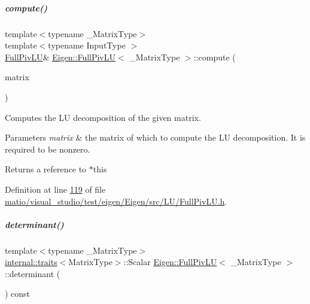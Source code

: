 \mbox{\label{group___l_u___module_a0a3c3b1bbafa31a03567a4573ebabc79}} 
\subparagraph{\texorpdfstring{compute()}{compute()}\hspace{0.1cm}{\footnotesize\ttfamily [2/2]}}
{\footnotesize\ttfamily template$<$typename \+\_\+\+Matrix\+Type$>$ \\
template$<$typename Input\+Type $>$ \\
\hyperlink{group___l_u___module_class_eigen_1_1_full_piv_l_u}{Full\+Piv\+LU}\& \hyperlink{group___l_u___module_class_eigen_1_1_full_piv_l_u}{Eigen\+::\+Full\+Piv\+LU}$<$ \+\_\+\+Matrix\+Type $>$\+::compute (\begin{DoxyParamCaption}\item[{const \hyperlink{group___core___module_struct_eigen_1_1_eigen_base}{Eigen\+Base}$<$ Input\+Type $>$ \&}]{matrix }\end{DoxyParamCaption})\hspace{0.3cm}{\ttfamily [inline]}}

Computes the LU decomposition of the given matrix.


\begin{DoxyParams}{Parameters}
{\em matrix} & the matrix of which to compute the LU decomposition. It is required to be nonzero.\\
\hline
\end{DoxyParams}
\begin{DoxyReturn}{Returns}
a reference to $\ast$this 
\end{DoxyReturn}


Definition at line \hyperlink{matio_2visual__studio_2test_2eigen_2_eigen_2src_2_l_u_2_full_piv_l_u_8h_source_l00119}{119} of file \hyperlink{matio_2visual__studio_2test_2eigen_2_eigen_2src_2_l_u_2_full_piv_l_u_8h_source}{matio/visual\+\_\+studio/test/eigen/\+Eigen/src/\+L\+U/\+Full\+Piv\+L\+U.\+h}.

\mbox{\label{group___l_u___module_a25d0b21682313c33f82988c708c4616f}} 
\subparagraph{\texorpdfstring{determinant()}{determinant()}\hspace{0.1cm}{\footnotesize\ttfamily [1/2]}}
{\footnotesize\ttfamily template$<$typename \+\_\+\+Matrix\+Type$>$ \\
\hyperlink{struct_eigen_1_1internal_1_1traits}{internal\+::traits}$<$Matrix\+Type$>$\+::Scalar \hyperlink{group___l_u___module_class_eigen_1_1_full_piv_l_u}{Eigen\+::\+Full\+Piv\+LU}$<$ \+\_\+\+Matrix\+Type $>$\+::determinant (\begin{DoxyParamCaption}{ }\end{DoxyParamCaption}) const}

